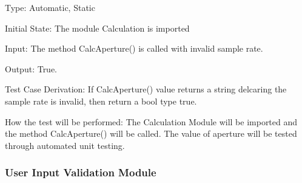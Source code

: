 \documentclass[12pt, titlepage]{article}
\begin{document}
\begin{enumerate}[{UT-C}1.]
  Type: Automatic, Static 

  Initial State: The module Calculation is imported

  Input: The method CalcAperture() is called  with invalid sample rate. 

  Output: True.

  Test Case Derivation: If CalcAperture() value returns a string delcaring the sample rate is invalid, then return a bool type true.

  How the test will be performed: The Calculation Module will be imported and the method CalcAperture() will be called. The value of aperture will be tested through automated unit testing.
      
  \end{enumerate}


  \subsubsection{User Input Validation Module }
\end{document}
